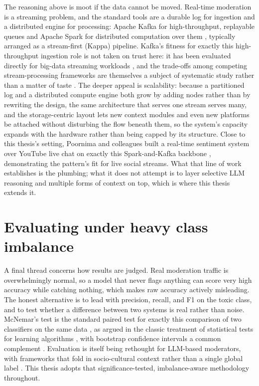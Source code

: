 The reasoning above is moot if the data cannot be moved. Real-time moderation is a streaming problem, and the standard tools are a durable log for ingestion and a distributed engine for processing: Apache Kafka for high-throughput, replayable queues \citep{kafka2011} and Apache Spark for distributed computation over them \citep{spark2016}, typically arranged as a stream-first (Kappa) pipeline. Kafka's fitness for exactly this high-throughput ingestion role is not taken on trust here: it has been evaluated directly for big-data streaming workloads \citep{kafkaeval2017}, and the trade-offs among competing stream-processing frameworks are themselves a subject of systematic study rather than a matter of taste \citep{streamframeworks2019}. The deeper appeal is scalability: because a partitioned log and a distributed compute engine both grow by adding nodes rather than by rewriting the design, the same architecture that serves one stream serves many, and the storage-centric layout lets new context modules and even new platforms be attached without disturbing the flow beneath them, so the system's capacity expands with the hardware rather than being capped by its structure. Close to this thesis's setting, Poornima and colleagues built a real-time sentiment system over YouTube live chat on exactly this Spark-and-Kafka backbone \citep{poornima2025}, demonstrating the pattern's fit for live social streams. What that line of work establishes is the plumbing; what it does not attempt is to layer selective LLM reasoning and multiple forms of context on top, which is where this thesis extends it.

\section{Evaluating under heavy class imbalance}\label{evaluating-under-heavy-class-imbalance}

A final thread concerns how results are judged. Real moderation traffic is overwhelmingly normal, so a model that never flags anything can score very high accuracy while catching nothing, which makes raw accuracy actively misleading. The honest alternative is to lead with precision, recall, and F1 on the toxic class, and to test whether a difference between two systems is real rather than noise. McNemar's test is the standard paired test for exactly this comparison of two classifiers on the same data \citep{mcnemar1947}, as argued in the classic treatment of statistical tests for learning algorithms \citep{dietterich1998}, with bootstrap confidence intervals a common complement \citep{efron1993}. Evaluation is itself being rethought for LLM-based moderators, with frameworks that fold in socio-cultural context rather than a single global label \citep{socioculturaleval2024}. This thesis adopts that significance-tested, imbalance-aware methodology throughout.

